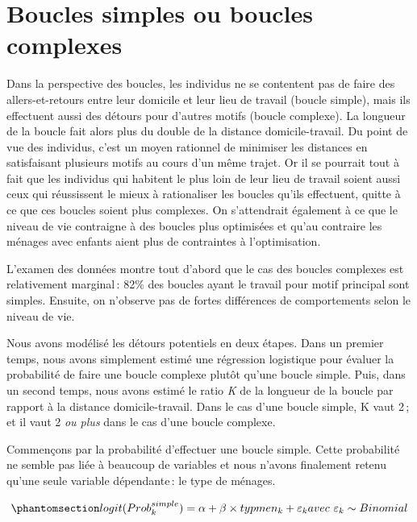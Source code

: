 \documentclass[
  9pt,
  a4paper,
  DIV=11]{scrreprt}
\begin{document}
\section{Boucles simples ou boucles
complexes}\label{boucles-simples-ou-boucles-complexes}

Dans la perspective des boucles, les individus ne se contentent pas de
faire des allers-et-retours entre leur domicile et leur lieu de travail
(boucle simple), mais ils effectuent aussi des détours pour d'autres
motifs (boucle complexe). La longueur de la boucle fait alors plus du
double de la distance domicile-travail. Du point de vue des individus,
c'est un moyen rationnel de minimiser les distances en satisfaisant
plusieurs motifs au cours d'un même trajet. Or il se pourrait tout à
fait que les individus qui habitent le plus loin de leur lieu de travail
soient aussi ceux qui réussissent le mieux à rationaliser les boucles
qu'ils effectuent, quitte à ce que ces boucles soient plus complexes. On
s'attendrait également à ce que le niveau de vie contraigne à des
boucles plus optimisées et qu'au contraire les ménages avec enfants
aient plus de contraintes à l'optimisation.

L'examen des données montre tout d'abord que le cas des boucles
complexes est relativement marginal\,: 82\% des boucles ayant le travail
pour motif principal sont simples. Ensuite, on n'observe pas de fortes
différences de comportements selon le niveau de vie.

Nous avons modélisé les détours potentiels en deux étapes. Dans un
premier temps, nous avons simplement estimé une régression logistique
pour évaluer la probabilité de faire une boucle complexe plutôt qu'une
boucle simple. Puis, dans un second temps, nous avons estimé le ratio
\emph{K} de la longueur de la boucle par rapport à la distance
domicile-travail. Dans le cas d'une boucle simple, K vaut 2\,; et il
vaut 2 \emph{ou plus} dans le cas d'une boucle complexe.

Commençons par la probabilité d'effectuer une boucle simple. Cette
probabilité ne semble pas liée à beaucoup de variables et nous n'avons
finalement retenu qu'une seule variable dépendante\,: le type de
ménages.

\begin{equation}\phantomsection\label{eq-logit-bcl-simple}{
logit(Prob^{simple}_k) = \alpha + \beta \times typmen_k +\varepsilon_k \\ avec\ \varepsilon_k \sim Binomial
}\end{equation}
\end{document}
